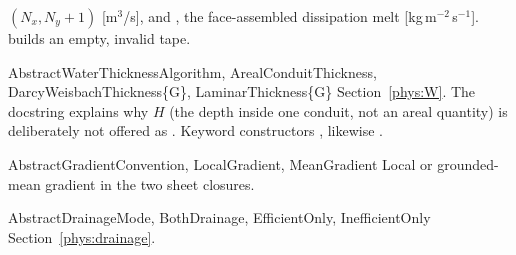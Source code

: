\begin{fnlist}
  $(N_x, N_y{+}1)$ [m$^3$/s], and , the face-assembled dissipation melt [kg\,m$^{-2}$\,s$^{-1}$].
   builds an empty, invalid tape.
\item[AbstractWaterThicknessAlgorithm, ArealConduitThickness, DarcyWeisbachThickness\{G\}, LaminarThickness\{G\}] Section~\ref{phys:W}. The
  docstring explains why $H$ (the depth inside one conduit, not an areal quantity) is deliberately not offered as . Keyword
  constructors , likewise .
\item[AbstractGradientConvention, LocalGradient, MeanGradient] Local or grounded-mean gradient in the two sheet closures.
\item[AbstractDrainageMode, BothDrainage, EfficientOnly, InefficientOnly] Section~\ref{phys:drainage}.
\end{fnlist}


